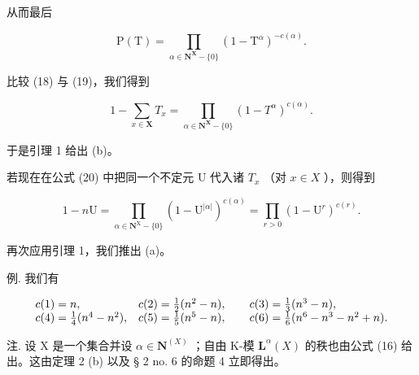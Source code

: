 从而最后

\[
\mathrm{P} (\mathrm{T}) = \prod_ {\alpha \in \mathbf {N} ^ {\mathbf {X}} - \{0 \}} (1 - \mathrm{T} ^ {\alpha}) ^ {- c (\alpha)}.\tag{19}
\]

比较 (18) 与 (19)，我们得到

\[
1 - \sum_ {x \in \mathbf {X}} T _ {x} = \prod_ {\alpha \in \mathbf {N} ^ {\mathbf {X}} - \{0\}} (1 - T ^ {\alpha}) ^ {c (\alpha)}.\tag{20}
\]

于是引理 1 给出 (b)。

若现在在公式 (20) 中把同一个不定元 U 代入诸 \(T_{x}\) （对 \(x \in X\) ），则得到

\[
1 - n \mathrm{U} = \prod_ {\alpha \in \mathbf {N} ^ {\mathrm{X}} - \{0\}} (1 - \mathrm{U} ^ {| \alpha |}) ^ {c (\alpha)} = \prod_ {r > 0} (1 - \mathrm{U} ^ {r}) ^ {c (r)}.
\]

再次应用引理 1，我们推出 (a)。

例. 我们有

\[
\begin{array}{l l} c (1) = n, & c (2) = \frac {1}{2} (n ^ {2} - n), \qquad c (3) = \frac {1}{3} (n ^ {3} - n), \\ c (4) = \frac {1}{4} (n ^ {4} - n ^ {2}), & c (5) = \frac {1}{5} (n ^ {5} - n), \qquad c (6) = \frac {1}{6} (n ^ {6} - n ^ {3} - n ^ {2} + n). \end{array}
\]

注. 设 X 是一个集合并设 \(\alpha \in \mathbf{N}^{(X)}\) ；自由 K-模 \(\mathbf{L}^{\alpha}(X)\) 的秩也由公式 (16) 给出。这由定理 2 (b) 以及 § 2 no. 6 的命题 4 立即得出。

